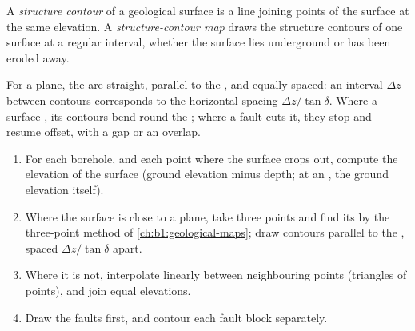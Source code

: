 \begin{definition}\label{def:b1:cross-sections:structure-contour}
A \emph{structure contour} of a geological surface
is a line joining points of the surface at the same elevation. A
\emph{structure-contour map} draws the
structure contours of one surface at a regular interval, whether the surface
lies underground or has been eroded away.
\end{definition}

For a plane, the  are straight, parallel to the ,
and equally spaced: an interval $\Delta z$ between contours corresponds to
the horizontal spacing $\Delta z/\tan\delta$. Where a surface , its
contours bend round the ; where a fault cuts it, they stop and resume
offset, with a gap or an overlap.

\begin{method}\label{met:b1:cross-sections:structure-contours}
\begin{enumerate}
  \item For each borehole, and each point where the surface crops out,
        compute the elevation of the surface (ground elevation minus depth;
        at an , the ground elevation itself).
  \item Where the surface is close to a plane, take three points and find
        its  by the three-point method of
        \cref{ch:b1:geological-maps}; draw contours parallel to the ,
        spaced $\Delta z/\tan\delta$ apart.
  \item Where it is not, interpolate linearly between neighbouring points
        (triangles of points), and join equal elevations.
  \item Draw the faults first, and contour each fault block separately.
\end{enumerate}
\end{method}

